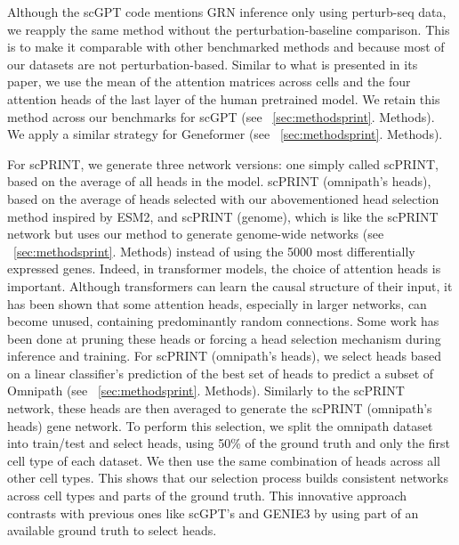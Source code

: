 Although the \gls{scGPT} code mentions \gls{GRN} inference only using perturb-seq data, we reapply the same method without the perturbation-baseline comparison. This is to make it comparable with other benchmarked methods and because most of our datasets are not perturbation-based. Similar to what is presented in its paper, we use the mean of the attention matrices across cells and the four attention heads of the last layer of the human pretrained model. We retain this method across our benchmarks for \gls{scGPT} (see ~\ref{sec:methodsprint}. Methods). We apply a similar strategy for Geneformer (see ~\ref{sec:methodsprint}. Methods).

For \gls{scPRINT}, we generate three network versions: one simply called \gls{scPRINT}, based on the average of all heads in the model. \gls{scPRINT} (omnipath's heads), based on the average of heads selected with our abovementioned head selection method inspired by \gls{ESM}2, and \gls{scPRINT} (genome), which is like the \gls{scPRINT} network but uses our method to generate genome-wide networks (see ~\ref{sec:methodsprint}. Methods) instead of using the 5000 most differentially expressed genes. Indeed, in transformer models, the choice of attention heads is important. Although transformers can learn the causal structure of their input, it has been shown that some attention heads, especially in larger networks, can become unused, containing predominantly random connections\citep{nichaniHowTransformersLearn2024}. Some work has been done at pruning these heads\citep{shimLayerwisePruningTransformer2021} or forcing a head selection mechanism during inference and training\citep{fedusSwitchTransformersScaling2022}. For \gls{scPRINT} (omnipath's heads), we select heads based on a linear classifier's prediction of the best set of heads to predict a subset of Omnipath (see ~\ref{sec:methodsprint}. Methods). Similarly to the \gls{scPRINT} network, these heads are then averaged to generate the \gls{scPRINT} (omnipath's heads) gene network. To perform this selection, we split the omnipath dataset into train/test and select heads, using 50\% of the ground truth and only the first cell type of each dataset. We then use the same combination of heads across all other cell types. This shows that our selection process builds consistent networks across cell types and parts of the ground truth. This innovative approach contrasts with previous ones like \gls{scGPT}'s and GENIE3 by using part of an available ground truth to select heads.

